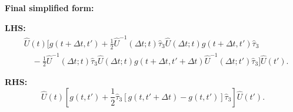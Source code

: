 \documentclass[11pt]{article}
\begin{document}
\textbf{Final simplified form:}

\textbf{LHS:}
\begin{equation}
\boxed{
\begin{split}
&\hat{U}(t) \Bigg[g(t+\Delta t, t') + \frac{1}{2} \hat{U}^{-1}(\Delta t; t) \hat{\tau}_3 \hat{U}(\Delta t; t) g(t+\Delta t, t') \hat{\tau}_3 \\
&\quad - \frac{1}{2} \hat{U}^{-1}(\Delta t; t) \hat{\tau}_3 \hat{U}(\Delta t; t) g(t+\Delta t, t'+\Delta t) \hat{U}^{-1}(\Delta t; t') \hat{\tau}_3\Bigg] \hat{U}(t').
\end{split}
}
\end{equation}

\textbf{RHS:}
\begin{equation}
\boxed{
\hat{U}(t) \left[g(t, t') + \frac{1}{2} \hat{\tau}_3 [g(t, t'+\Delta t) - g(t, t')] \hat{\tau}_3\right] \hat{U}(t').
}
\end{equation}
\end{document}
